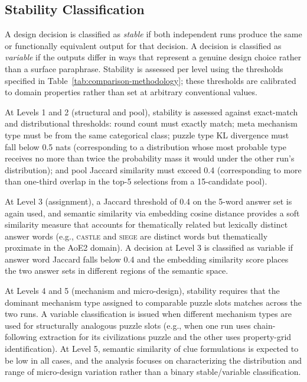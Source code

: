 \subsection{Stability Classification}
\label{sec:stability-classification}

A design decision is classified as \textit{stable} if both independent runs produce the same or functionally equivalent output for that decision. A decision is classified as \textit{variable} if the outputs differ in ways that represent a genuine design choice rather than a surface paraphrase. Stability is assessed per level using the thresholds specified in Table~\ref{tab:comparison-methodology}; these thresholds are calibrated to domain properties rather than set at arbitrary conventional values.

At Levels 1 and 2 (structural and pool), stability is assessed against exact-match and distributional thresholds: round count must exactly match; meta mechanism type must be from the same categorical class; puzzle type KL divergence must fall below 0.5 nats (corresponding to a distribution whose most probable type receives no more than twice the probability mass it would under the other run's distribution); and pool Jaccard similarity must exceed 0.4 (corresponding to more than one-third overlap in the top-5 selections from a 15-candidate pool).

At Level 3 (assignment), a Jaccard threshold of 0.4 on the 5-word answer set is again used, and semantic similarity via embedding cosine distance provides a soft similarity measure that accounts for thematically related but lexically distinct answer words (e.g., \textsc{castle} and \textsc{siege} are distinct words but thematically proximate in the AoE2 domain). A decision at Level 3 is classified as variable if answer word Jaccard falls below 0.4 and the embedding similarity score places the two answer sets in different regions of the semantic space.

At Levels 4 and 5 (mechanism and micro-design), stability requires that the dominant mechanism type assigned to comparable puzzle slots matches across the two runs. A variable classification is issued when different mechanism types are used for structurally analogous puzzle slots (e.g., when one run uses chain-following extraction for its civilizations puzzle and the other uses property-grid identification). At Level 5, semantic similarity of clue formulations is expected to be low in all cases, and the analysis focuses on characterizing the distribution and range of micro-design variation rather than a binary stable/variable classification.

